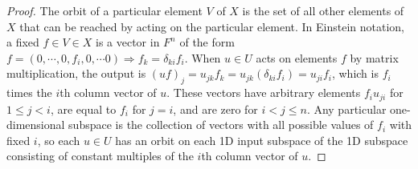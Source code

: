 \documentclass{article}
\begin{document}
\begin{proof}
  The orbit of a particular element $V$ of $X$ is the set of all other elements of $X$ that can be reached by acting on the particular element.
  In Einstein notation, a fixed $f\in V\in X$ is a vector in $F^{n}$ of the form $f = (0, \cdots, 0, f_{i}, 0,\cdots 0) \Rightarrow f_{k}= \delta_{ki}f_{i}$.
  When $u\in U$ acts on elements $f$ by matrix multiplication, the output is $(uf)_{j} = u_{jk}f_{k} = u_{jk}(\delta_{ki}f_{i}) = u_{ji}f_{i}$,
  which is $f_{i}$ times the $i$th column vector of $u$.
  These vectors have arbitrary elements $f_{i}u_{ji}$ for $1 \leq j < i$, are equal to $f_{i}$ for $j = i$, and are zero for $i < j \leq n$.
  Any particular one-dimensional subspace is the collection of vectors with all possible values of $f_{i}$ with fixed $i$, so
  each $u\in U$ has an orbit on each 1D input subspace of the 1D subspace consisting of constant multiples of the $i$th column vector of $u$.


\end{proof}
\end{document}
